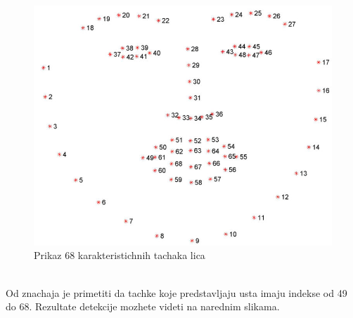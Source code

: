 \documentclass[a4paper, openany, oneside, 11pt]{book}
\begin{document}
\begin{figure}[h!]
\centering
  \includegraphics[scale=0.25]{res/facial_landmarks_68markup.jpg}
  \caption{Prikaz 68 karakteristichnih tachaka lica}
  \label{fig:2_4}
  \vspace{0pt}
\end{figure}\\
Od znachaja je primetiti da tachke koje predstavljaju usta imaju indekse od 49 do 68. Rezultate detekcije mozhete videti na narednim slikama.
\end{document}
